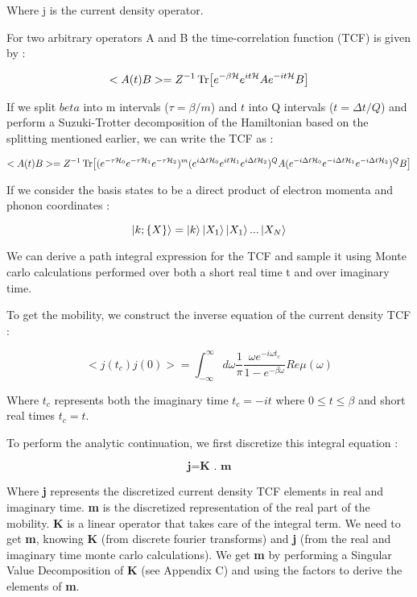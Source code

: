 Where j is the current density operator. 

For two arbitrary operators A and B the time-correlation function (TCF) is given by :

\begin{equation}
<A(t)B> = Z^{-1} \Tr[e^{-\beta \mathcal{H}} e^{it\mathcal{H}}Ae^{-it\mathcal{H}}B]
\end{equation}

If we split $beta$ into m intervals ($\tau = \beta/m$) and $t$ into Q intervals ($t= \Delta t/Q$) and perform a Suzuki-Trotter decomposition of the Hamiltonian based on the splitting mentioned earlier, we can write the TCF as :

\begin{equation}
<A(t)B> = Z^{-1} \Tr[(e^{-\tau \mathcal{H}_0}e^{-\tau \mathcal{H}_1}e^{-\tau \mathcal{H}_2})^m (e^{i\Delta t\mathcal{H}_0}e^{it\mathcal{H}_1}e^{i\Delta t\mathcal{H}_2})^QA(e^{-i \Delta t \mathcal{H}_0}e^{-i \Delta t \mathcal{H}_1}e^{-i \Delta t \mathcal{H}_2})^QB]
\end{equation}

If we consider the basis states to be a direct product of electron momenta and phonon coordinates :

\begin{equation}
    \ket{k;\{X\}} = \ket{k}\ket{X_1}\ket{X_1}...\ket{X_{N}}
\end{equation}

We can derive a path integral expression for the TCF and sample it using Monte carlo calculations performed over both a short real time t and over imaginary time.

To get the mobility, we construct the inverse equation of the current density TCF :

\begin{equation}
    <j(t_c)j(0)> = \int_{-\infty}^{\infty} d \omega \frac{1}{\pi} \frac{\omega e^{-i\omega t_c}}{1 - e^{-\beta \omega}} Re \mu(\omega)
\end{equation}

Where $t_c$ represents both the imaginary time $t_c = -it$ where $0 \leq t \leq \beta$ and short real times $t_c = t$.

To perform the analytic continuation, we first discretize this integral equation :

\begin{equation}
\textbf{j} = \textbf{K . m}
\end{equation}

Where \textbf{j} represents the discretized current density TCF elements in real and imaginary time. \textbf{m} is the discretized representation of the real part of the mobility. \textbf{K} is a linear operator that takes care of the integral term. We need to get \textbf{m}, knowing \textbf{K} (from discrete fourier transforms) and \textbf{j} (from the real and imaginary time monte carlo calculations). We get \textbf{m} by performing a Singular Value Decomposition of \textbf{K} (see Appendix C) and using the factors to derive the elements of \textbf{m}. 







